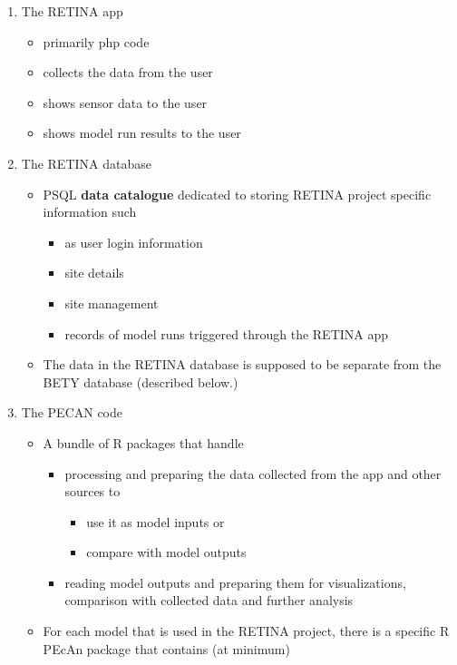 \documentclass[
]{article}
\providecommand{\tightlist}{%
  \setlength{\itemsep}{0pt}\setlength{\parskip}{0pt}}
\begin{document}
\begin{enumerate}
\def\labelenumi{\arabic{enumi}.}
\tightlist
\item
  The RETINA app

  \begin{itemize}
  \tightlist
  \item
    primarily php code
  \item
    collects the data from the user
  \item
    shows sensor data to the user
  \item
    shows model run results to the user
  \end{itemize}
\item
  The RETINA database

  \begin{itemize}
  \tightlist
  \item
    PSQL \textbf{data catalogue} dedicated to storing RETINA project
    specific information such

    \begin{itemize}
    \tightlist
    \item
      as user login information
    \item
      site details
    \item
      site management
    \item
      records of model runs triggered through the RETINA app
    \end{itemize}
  \item
    The data in the RETINA database is supposed to be separate from the
    BETY database (described below.)
  \end{itemize}
\item
  The PECAN code

  \begin{itemize}
  \tightlist
  \item
    A bundle of R packages that handle

    \begin{itemize}
    \tightlist
    \item
      processing and preparing the data collected from the app and other
      sources to

      \begin{itemize}
      \tightlist
      \item
        use it as model inputs or
      \item
        compare with model outputs
      \end{itemize}
    \item
      reading model outputs and preparing them for visualizations,
      comparison with collected data and further analysis
    \end{itemize}
  \item
    For each model that is used in the RETINA project, there is a
    specific R PEcAn package that contains (at minimum)


\end{itemize}
\end{enumerate}
\end{document}

